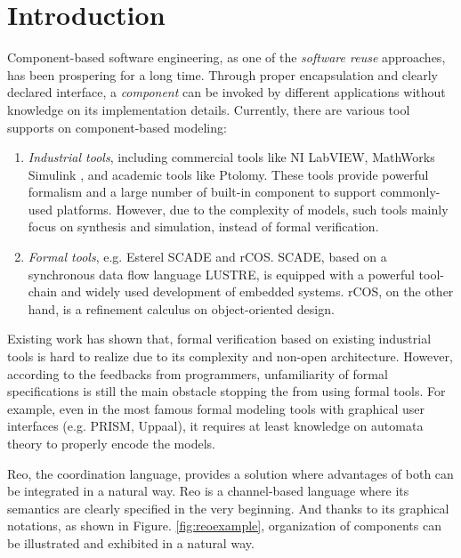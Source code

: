 \section{Introduction}
\label{sec:introduction}

Component-based software engineering, as one of the \emph{software reuse} approaches, has been prospering for a long time. Through proper encapsulation and clearly declared interface, a \emph{component} can be invoked by different applications without knowledge on its implementation details.
Currently, there are various tool supports on component-based modeling:
\begin{enumerate}
\item \emph{Industrial tools}, including commercial tools like NI LabVIEW\cite{ElliottLabview2007}, MathWorks Simulink , and academic tools like Ptolomy\cite{KimPtolomy2017}. These tools  provide powerful formalism and a large number of built-in component to support commonly-used platforms. However, due to the complexity of models, such tools mainly focus on synthesis and simulation, instead of formal verification.

\item \emph{Formal tools}, e.g. Esterel SCADE\cite{AbdullaISoLA2006} and rCOS\cite{LiuFsenRcos2010}. SCADE, based on a synchronous data flow language LUSTRE, is equipped with a powerful tool-chain and widely used development of embedded systems. rCOS, on the other hand, is a refinement calculus on object-oriented design.
\end{enumerate}

Existing work\cite{ZouSimulinkHcsp2013} has shown that, formal verification based on existing industrial tools is hard to realize due to its complexity and non-open architecture. However, according to the feedbacks from programmers, unfamiliarity of formal specifications is still the main obstacle stopping the from using formal tools. For example, even in the most famous formal modeling tools with graphical user interfaces (e.g. PRISM\cite{KwiatkowskaCavPrism2011}, Uppaal\cite{AmnellMovepUppaal2001}), it requires at least knowledge on automata theory to properly encode the models.

Reo\cite{ArbabMscsReo2004}, the coordination language, provides a solution where advantages of both can be integrated in a natural way. Reo is a channel-based language where its semantics are clearly specified in the very beginning. And thanks to its graphical notations, as shown in Figure. \ref{fig:reoexample}, organization of components can be illustrated and exhibited in a natural way.

